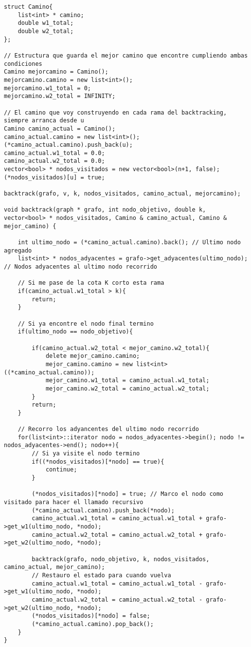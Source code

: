\begin{lstlisting}
struct Camino{
	list<int> * camino;
	double w1_total;
	double w2_total;
};

// Estructura que guarda el mejor camino que encontre cumpliendo ambas condiciones
Camino mejorcamino = Camino();
mejorcamino.camino = new list<int>();
mejorcamino.w1_total = 0;
mejorcamino.w2_total = INFINITY;

// El camino que voy construyendo en cada rama del backtracking, siempre arranca desde u
Camino camino_actual = Camino();
camino_actual.camino = new list<int>();
(*camino_actual.camino).push_back(u);
camino_actual.w1_total = 0.0;
camino_actual.w2_total = 0.0;
vector<bool> * nodos_visitados = new vector<bool>(n+1, false);
(*nodos_visitados)[u] = true;
		
backtrack(grafo, v, k, nodos_visitados, camino_actual, mejorcamino);

void backtrack(graph * grafo, int nodo_objetivo, double k, vector<bool> * nodos_visitados, Camino & camino_actual, Camino & mejor_camino) {
	
	int ultimo_nodo = (*camino_actual.camino).back(); // Ultimo nodo agregado
	list<int> * nodos_adyacentes = grafo->get_adyacentes(ultimo_nodo); // Nodos adyacentes al ultimo nodo recorrido
	
	// Si me pase de la cota K corto esta rama
	if(camino_actual.w1_total > k){
		return;
	}
	
	// Si ya encontre el nodo final termino
	if(ultimo_nodo == nodo_objetivo){

		if(camino_actual.w2_total < mejor_camino.w2_total){
			delete mejor_camino.camino;
			mejor_camino.camino = new list<int>((*camino_actual.camino));
			mejor_camino.w1_total = camino_actual.w1_total;
			mejor_camino.w2_total = camino_actual.w2_total;
		}
		return;
	}
	
	// Recorro los adyancentes del ultimo nodo recorrido
	for(list<int>::iterator nodo = nodos_adyacentes->begin(); nodo != nodos_adyacentes->end(); nodo++){
		// Si ya visite el nodo termino
		if((*nodos_visitados)[*nodo] == true){
			continue;
		}

		(*nodos_visitados)[*nodo] = true; // Marco el nodo como visitado para hacer el llamado recursivo
		(*camino_actual.camino).push_back(*nodo);
		camino_actual.w1_total = camino_actual.w1_total + grafo->get_w1(ultimo_nodo, *nodo);
		camino_actual.w2_total = camino_actual.w2_total + grafo->get_w2(ultimo_nodo, *nodo);
		
		backtrack(grafo, nodo_objetivo, k, nodos_visitados, camino_actual, mejor_camino);
		// Restauro el estado para cuando vuelva
		camino_actual.w1_total = camino_actual.w1_total - grafo->get_w1(ultimo_nodo, *nodo);
		camino_actual.w2_total = camino_actual.w2_total - grafo->get_w2(ultimo_nodo, *nodo);
		(*nodos_visitados)[*nodo] = false;
		(*camino_actual.camino).pop_back();		
	}
}
\end{lstlisting}

